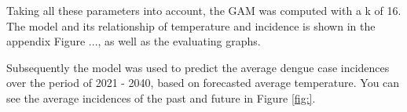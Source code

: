 Taking all these parameters into account, the GAM was computed with a k of 16. The model and its relationship of temperature and incidence is shown in the appendix Figure ..., as well as the evaluating graphs.

Subsequently the model was used to predict the average dengue case incidences over the period of 2021 - 2040, based on forecasted average temperature. You can see the average incidences of the past and future in Figure \ref{fig:}.

